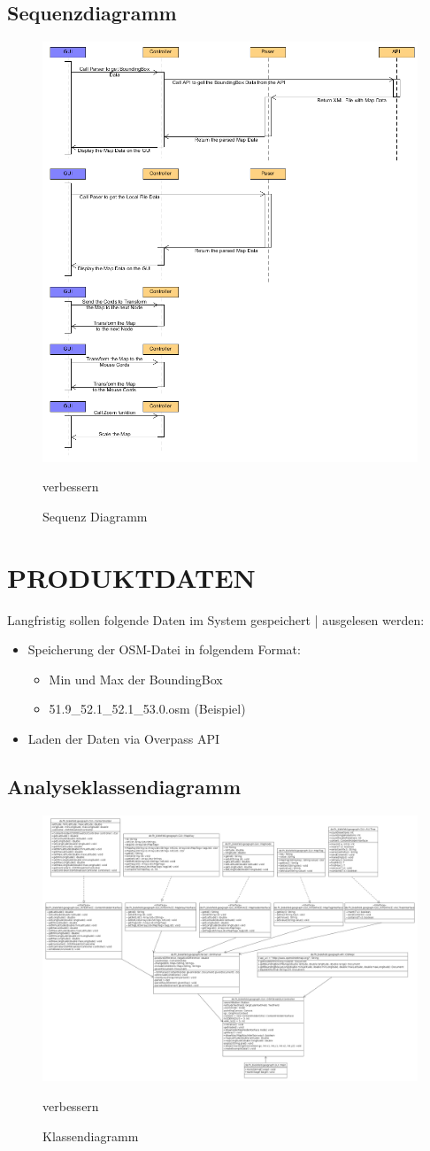 	\subsection{Sequenzdiagramm}
	\begin{figure}[H]
	\centering
	\includegraphics[width=0.7\linewidth]{images/Squenz}
	\caption{Sequenz Diagramm}
	\label{fig:Sequenz Diagramm}
	verbessern
	\end{figure}
	
\newpage
	\section{\Large PRODUKTDATEN}
		Langfristig sollen folgende Daten im System gespeichert | ausgelesen werden:
	\begin{itemize}
		\item Speicherung der OSM-Datei in folgendem Format: 
		\begin{itemize}
			\item Min und Max der BoundingBox
			\item 51.9\_52.1\_52.1\_53.0.osm (Beispiel)
		\end{itemize}
		\item Laden der Daten via Overpass API
	\end{itemize}
	\subsection{Analyseklassendiagramm}	
		\begin{figure}[H]
		\centering
		\includegraphics[width=0.7\linewidth]{images/Klassendiagramm}
		\caption{Klassendiagramm}
		\label{fig:Klassendiagramm}
		verbessern
	\end{figure}
